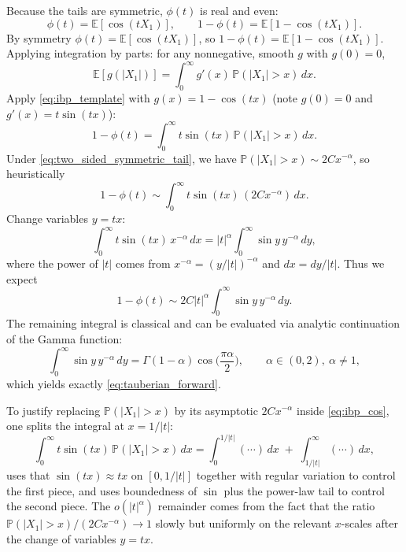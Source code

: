 \documentclass[11pt]{article}
\begin{document}
Because the tails are symmetric, $\phi(t)$ is real and even:
\begin{equation}\label{eq:phi_real_even}
\phi(t)= {\mathbb E}[\cos(tX_1)],
\qquad
1-\phi(t) = {\mathbb E}[1-\cos(tX_1)].
\end{equation}
By symmetry $\phi(t)={\mathbb E}[\cos(tX_1)]$, so $1-\phi(t)={\mathbb E}[1-\cos(tX_1)]$. Applying integration by parts: for any nonnegative, smooth $g$ with $g(0)=0$,
\begin{equation}\label{eq:ibp_template}
{\mathbb E}[g(|X_1|)]
= \int_0^\infty g'(x)\,{\mathbb P}(|X_1|>x)\,dx.
\end{equation}
Apply \eqref{eq:ibp_template} with $g(x)=1-\cos(tx)$ (note $g(0)=0$ and $g'(x)=t\sin(tx)$):
\begin{equation}\label{eq:ibp_cos}
1-\phi(t)
= \int_0^\infty t\sin(tx)\,{\mathbb P}(|X_1|>x)\,dx.
\end{equation}
Under \eqref{eq:two_sided_symmetric_tail}, we have ${\mathbb P}(|X_1|>x)\sim 2C x^{-\alpha}$, so heuristically
\begin{equation}\label{eq:asympt_substitution}
1-\phi(t)
\sim \int_0^\infty t\sin(tx)\, (2C x^{-\alpha})\,dx.
\end{equation}
Change variables $y=tx$:
\begin{equation}\label{eq:change_var}
\int_0^\infty t\sin(tx)\,x^{-\alpha}\,dx
= |t|^\alpha \int_0^\infty \sin y \, y^{-\alpha}\,dy,
\end{equation}
where the power of $|t|$ comes from $x^{-\alpha}=(y/|t|)^{-\alpha}$ and $dx=dy/|t|$.
Thus we expect
\begin{equation}\label{eq:1_minus_phi_constant}
1-\phi(t)\sim 2C |t|^\alpha \int_0^\infty \sin y\, y^{-\alpha}\,dy.
\end{equation}
The remaining integral is classical and can be evaluated via analytic continuation of the Gamma function:
\begin{equation}\label{eq:sin_integral}
\int_0^\infty \sin y\, y^{-\alpha}\,dy
= \Gamma(1-\alpha)\cos\!\Big(\frac{\pi\alpha}{2}\Big),
\qquad \alpha\in(0,2),\ \alpha\neq 1,
\end{equation}
which yields exactly \eqref{eq:tauberian_forward}.

To justify replacing ${\mathbb P}(|X_1|>x)$ by its asymptotic $2C x^{-\alpha}$ inside \eqref{eq:ibp_cos}, one splits the integral at $x=1/|t|$:
\begin{equation}\label{eq:split_scale}
\int_0^\infty t\sin(tx)\,{\mathbb P}(|X_1|>x)\,dx
=
\int_0^{1/|t|} (\cdots)\,dx \;+\; \int_{1/|t|}^{\infty}(\cdots)\,dx,
\end{equation}
uses that $\sin(tx)\approx tx$ on $[0,1/|t|]$ together with regular variation to control the first piece, and uses boundedness of $\sin$ plus the power-law tail to control the second piece. The $o(|t|^\alpha)$ remainder comes from the fact that the ratio ${\mathbb P}(|X_1|>x)/(2C x^{-\alpha})\to 1$ slowly but uniformly on the relevant $x$-scales after the change of variables $y=tx$.
\end{document}
